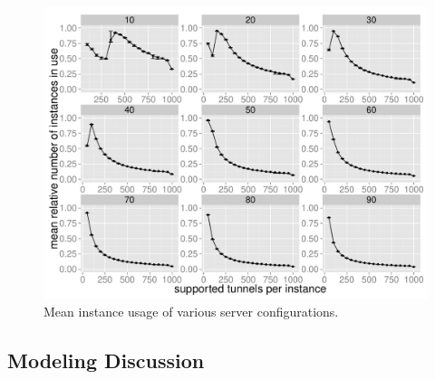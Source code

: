 \begin{figure}[htb]
  \centering
  \includegraphics[width=1.0\textwidth]{images/instanceuse-mean.pdf}
  \caption{Mean instance usage of various server configurations.}
 \label{c4:fig:res-instance-usage-mean}
\end{figure}



\subsection{Modeling Discussion}

